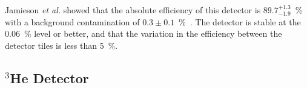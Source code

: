 Jamieson {\it{et al.}} showed that the absolute efficiency of this
detector is $89.7^{+1.3}_{-1.9}$~\% with a background contamination of
$0.3 \pm 0.1$~\%~\cite{jamieson2017characterization}. The detector is
stable at the 0.06~\% level or better, and that the variation in the
efficiency between the detector tiles is less than 5~\%.
\subsection{$^3$He Detector}





  
  
  
  
  
  
 

  

